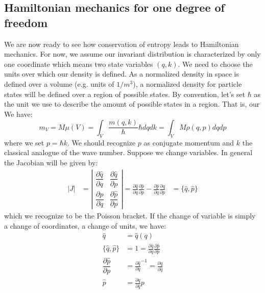 \documentclass[11pt]{article}
\begin{document}
\subsection*{Hamiltonian mechanics for one degree of freedom}

We are now ready to see how conservation of entropy leads to Hamiltonian mechanics. For now, we assume our invariant distribution is characterized by only one coordinate which means two state variables $(q, k)$. We need to choose the units over which our density is defined. As a normalized density in space is defined over a volume (e.g. units of $1/m^3$), a normalized density for particle states will be defined over a region of possible states. By convention, let's set $\hbar$ as the unit we use to describe the amount of possible states in a region. That is, our   We have:
\begin{equation}
m_V = M \mu(V) =\int_V \frac{m(q, k)}{\hbar} \hbar dq dk = \int_V M \rho(q, p) dq dp
\end{equation}
where we set $p=\hbar k$. We should recognize $p$ as conjugate momentum and $k$ the classical analogue of the wave number. Suppose we change variables. In general the Jacobian will be given by:
\begin{equation}
\label{Poisson}
\begin{aligned}
|J| &= \left| \begin{matrix}
\dfrac{\partial \hat{q}}{\partial q} & \dfrac{\partial \hat{q}}{\partial p} \\[2.2ex]
\dfrac{\partial \hat{p}}{\partial q} & \dfrac{\partial \hat{p}}{\partial p} \end{matrix} \right| = \frac{\partial \hat{q}}{\partial q} \frac{\partial \hat{p}}{\partial p} - \frac{\partial \hat{p}}{\partial q} \frac{\partial \hat{q}}{\partial p} &= \{\hat{q}, \hat{p}\}
\end{aligned}
\end{equation}
which we recognize to be the Poisson bracket. If the change of variable is simply a change of coordinates, a change of units, we have:
\begin{equation}
\label{coordinate_change}
\begin{aligned}
\hat{q} &= \hat{q}(q) \\
\{\hat{q}, \hat{p}\} &= 1 = \frac{\partial \hat{q}}{\partial q} \frac{\partial \hat{p}}{\partial p} \\
\dfrac{\partial \hat{p}}{\partial p} &= \frac{\partial \hat{q}}{\partial q} ^{-1} = \frac{\partial q}{\partial \hat{q}} \\
\hat{p} &= \frac{\partial q}{\partial \hat{q}} p
\end{aligned}
\end{equation}
\end{document}
